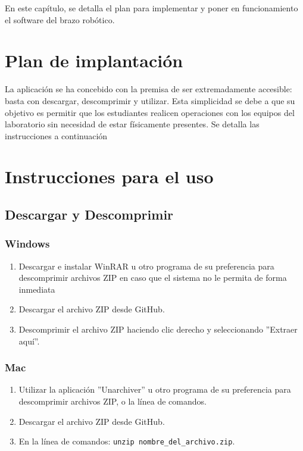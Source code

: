 En este capítulo, se detalla el plan para implementar y poner en funcionamiento el software del brazo robótico.
\section{Plan de implantación}

La aplicación se ha concebido con la premisa de ser extremadamente accesible: basta con descargar, descomprimir y utilizar. Esta simplicidad se debe a que su objetivo es permitir que los estudiantes realicen operaciones con los equipos del laboratorio sin necesidad de estar físicamente presentes.
Se detalla las instrucciones a continuación

\section*{Instrucciones para el uso}

\subsection*{Descargar y Descomprimir}

\subsubsection*{Windows}

\begin{enumerate}[label=\arabic*.-]
    \item Descargar e instalar WinRAR u otro programa de su preferencia para descomprimir archivos ZIP en caso que el sistema no le permita de forma inmediata
    \item Descargar el archivo ZIP desde GitHub.
    \item Descomprimir el archivo ZIP haciendo clic derecho y seleccionando ''Extraer aquí''.
\end{enumerate}

\subsubsection*{Mac}

\begin{enumerate}[label=\arabic*.-]
    \item Utilizar la aplicación ''Unarchiver'' u otro programa de su preferencia para descomprimir archivos ZIP, o la línea de comandos.
    \item Descargar el archivo ZIP desde GitHub.
    \item En la línea de comandos: \verb|unzip nombre_del_archivo.zip|.
\end{enumerate}

